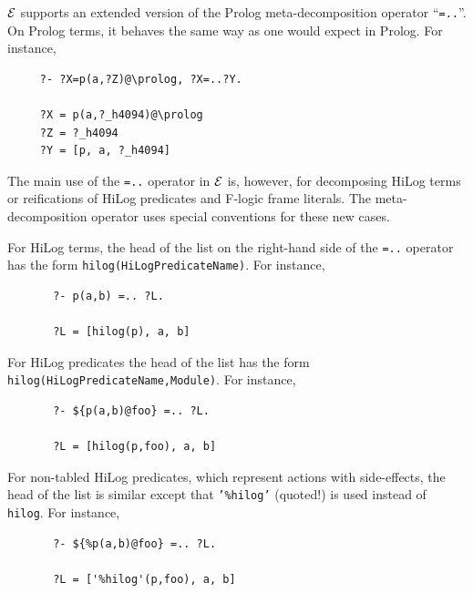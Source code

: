 \documentclass[11pt]{article}
\newcommand{\ERGO}{\mbox{\ensuremath{\cal{E}}\smaller{{\sc{RGO}}}}\xspace}
\newcommand{\FLSYSTEM}{\ERGO}
\begin{document}
\FLSYSTEM supports an extended version of the Prolog meta-decomposition
operator ``{\tt =..}''. On Prolog terms, it behaves the same way as one
would expect in Prolog. For instance, 
\begin{verbatim}
     ?- ?X=p(a,?Z)@\prolog, ?X=..?Y.
 
     ?X = p(a,?_h4094)@\prolog
     ?Z = ?_h4094
     ?Y = [p, a, ?_h4094]
\end{verbatim}

The main use of the {\tt =..} operator in \FLSYSTEM is, however, for
decomposing HiLog terms or reifications of HiLog predicates and F-logic
frame literals. The meta-decomposition operator uses special
conventions for these new cases.

For HiLog terms, the head of the list on the right-hand side of the {\tt =..}
operator has the form {\tt hilog(HiLogPredicateName)}. For instance, 
\begin{verbatim}
       ?- p(a,b) =.. ?L.
 
       ?L = [hilog(p), a, b]
\end{verbatim}
For HiLog predicates the head of the list has the form {\tt
  hilog(HiLogPredicateName,Module)}. For instance,
\begin{verbatim}
       ?- ${p(a,b)@foo} =.. ?L.
 
       ?L = [hilog(p,foo), a, b]
\end{verbatim}
For non-tabled HiLog predicates, which represent actions with side-effects,
the head of the list is similar except that {\tt '\%hilog'} (quoted!) is 
used instead of {\tt hilog}.  For instance,
\begin{verbatim}
       ?- ${%p(a,b)@foo} =.. ?L.
 
       ?L = ['%hilog'(p,foo), a, b]
\end{verbatim}
\end{document}
